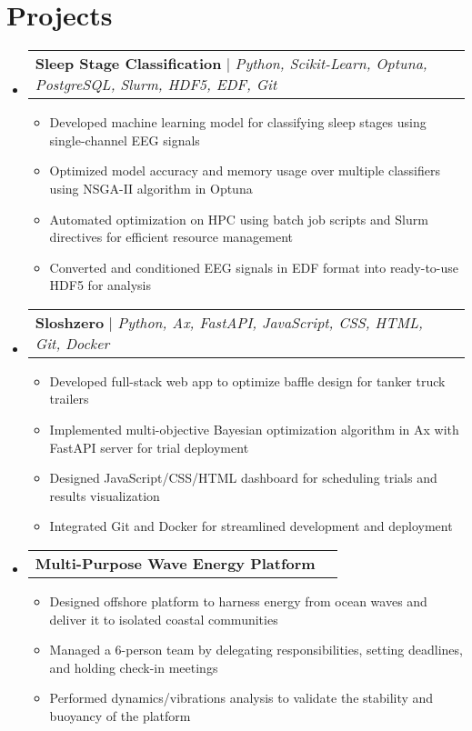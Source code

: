 \documentclass[letterpaper,11pt]{article}
\makeatletter
\newcommand{\resumeItem}[1]{
  \item\small{
    {#1 \vspace{-2pt}}
  }
}
\newcommand{\resumeProjectHeading}[1]{
    \item
    \begin{tabular*}{0.97\textwidth}{l@{\extracolsep{\fill}}r}
      \small#1 \\
    \end{tabular*}\vspace{-7pt}
}
\newcommand{\resumeSubHeadingListStart}{\begin{itemize}[leftmargin=0.15in, label={}]}
\newcommand{\resumeSubHeadingListEnd}{\end{itemize}}
\newcommand{\resumeItemListStart}{\begin{itemize}}
\newcommand{\resumeItemListEnd}{\end{itemize}\vspace{-5pt}}
\makeatother
\begin{document}
\section{Projects}
    \resumeSubHeadingListStart
      \resumeProjectHeading
          {\textbf{Sleep Stage Classification} $|$ \emph{Python, Scikit-Learn, Optuna, PostgreSQL, Slurm, HDF5, EDF, Git}}
          \resumeItemListStart
            \resumeItem{Developed machine learning model for classifying sleep stages using single-channel EEG signals}
            \resumeItem{Optimized model accuracy and memory usage over multiple classifiers using NSGA-II algorithm in Optuna}
            \resumeItem{Automated optimization on HPC using batch job scripts and Slurm directives for efficient resource management}
            \resumeItem{Converted and conditioned EEG signals in EDF format into ready-to-use HDF5 for analysis}
          \resumeItemListEnd
      \resumeProjectHeading
          {\textbf{Sloshzero} $|$ \emph{Python, Ax, FastAPI, JavaScript, CSS, HTML, Git, Docker}}
          \resumeItemListStart
            \resumeItem{Developed full-stack web app to optimize baffle design for tanker truck trailers}
            \resumeItem{Implemented multi-objective Bayesian optimization algorithm in Ax with FastAPI server for trial deployment}
            \resumeItem{Designed JavaScript/CSS/HTML dashboard for scheduling trials and results visualization}
            \resumeItem{Integrated Git and Docker for streamlined development and deployment}
          \resumeItemListEnd
      \resumeProjectHeading
          {\textbf{Multi-Purpose Wave Energy Platform}}
          \resumeItemListStart
            \resumeItem{Designed offshore platform to harness energy from ocean waves and deliver it to isolated coastal communities}
            \resumeItem{Managed a 6-person team by delegating responsibilities, setting deadlines, and holding check-in meetings}
            \resumeItem{Performed dynamics/vibrations analysis to validate the stability and buoyancy of the platform}
          \resumeItemListEnd
    \resumeSubHeadingListEnd



%
\end{document}

